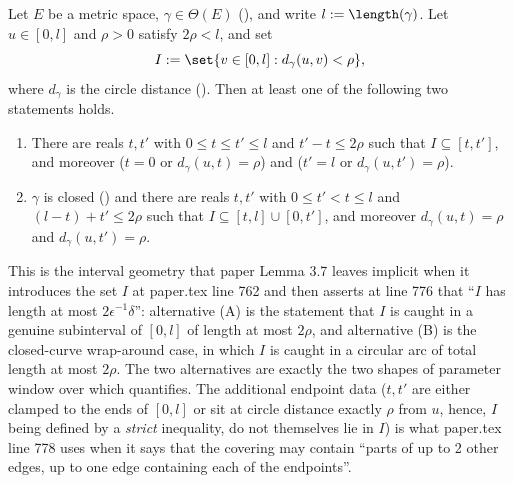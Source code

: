 \begin{helper}
  Let $E$ be a metric space, $\gamma \in \Theta(E)$ (), and write $l :=
  \length(\gamma)$. Let $u \in [0,l]$ and $\rho > 0$ satisfy $2\rho < l$, and set
  \[
    I := \set{v \in [0,l] : d_\gamma(u,v) < \rho}
    ,
  \]
  where $d_\gamma$ is the circle distance (). Then at least one of the following
  two statements holds.
  \begin{enumerate}
    \item[(A)] There are reals $t,t'$ with $0 \leq t \leq t' \leq l$ and $t' - t \leq 2\rho$ such
      that $I \subseteq [t,t']$, and moreover ($t = 0$ or $d_\gamma(u,t) = \rho$) and ($t' = l$ or
      $d_\gamma(u,t') = \rho$).
    \item[(B)] $\gamma$ is closed () and there are reals $t,t'$ with $0 \leq
      t' < t \leq l$ and $(l-t) + t' \leq 2\rho$ such that $I \subseteq [t,l] \cup [0,t']$, and
      moreover $d_\gamma(u,t) = \rho$ and $d_\gamma(u,t') = \rho$.
  \end{enumerate}

  This is the interval geometry that paper Lemma 3.7 leaves implicit when it introduces the set
  $I$ at paper.tex line 762 and then asserts at line 776 that ``$I$ has length at most
  $2\epsilon^{-1}\delta$'': alternative (A) is the statement that $I$ is caught in a genuine
  subinterval of $[0,l]$ of length at most $2\rho$, and alternative (B) is the closed-curve
  wrap-around case, in which $I$ is caught in a circular arc of total length at most $2\rho$. The
  two alternatives are exactly the two shapes of parameter window over which 
  quantifies. The additional endpoint data ($t,t'$ are either clamped to the ends of $[0,l]$ or
  sit at circle distance exactly $\rho$ from $u$, hence, $I$ being defined by a \emph{strict}
  inequality, do not themselves lie in $I$) is what paper.tex line 778 uses when it says that the
  covering may contain ``parts of up to 2 other edges, up to one edge containing each of the
  endpoints''.
\end{helper}
